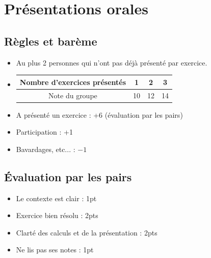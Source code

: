 \documentclass[14pt]{beamer}
\begin{document}
\section{Présentations orales}
\subsection{Règles et barème}

\begin{frame}

\begin{itemize}
\setlength\itemsep{10pt}
	\item
	Au plus 2 personnes qui n'ont pas déjà présenté par exercice.
	\item
	\begin{tabular}{|c|c|c|c|}\hline
		Nombre d'exercices présentés & 1 & 2 & 3 \\\hline
		Note du groupe & 10 & 12 & 14\\\hline
	\end{tabular}
	\item
	A présenté un exercice : +6 (évaluation par les pairs)
	\item
	Participation : +1
	\item
	Bavardages, etc... : $-1$
\end{itemize}

\end{frame}

\subsection{Évaluation par les pairs}

\begin{frame}

\begin{itemize}
\setlength\itemsep{10pt}
	\item
	Le contexte est clair : 1pt
	\item
	Exercice bien résolu : 2pts
	\item
	Clarté des calculs et de la présentation : 2pts
	\item
	Ne lis pas ses notes : 1pt
\end{itemize}

\end{frame}

%
%
%
%
%
%
\end{document}
